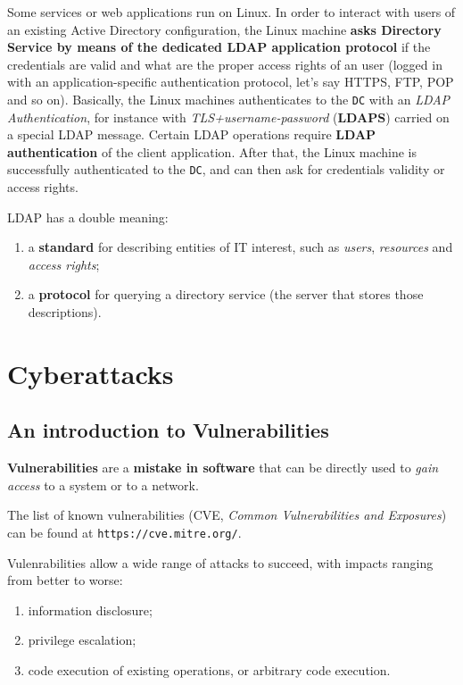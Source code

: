 \documentclass[10pt]{extbook}
\begin{document}
Some services or web applications run on Linux. In order to interact with users
of an existing Active Directory configuration, the Linux machine \textbf{asks
Directory Service by means of the dedicated LDAP application protocol} if the
credentials are valid and what are the proper access rights of an user (logged
in with an application\--specific authentication protocol, let's say HTTPS,
FTP, POP and so on). Basically, the Linux machines authenticates to the
\texttt{DC} with an \emph{LDAP Authentication}, for instance with
\emph{TLS+username\--password} (\textbf{LDAPS}) carried on a special LDAP
message. Certain LDAP operations require \textbf{LDAP authentication} of the
client application. After that, the Linux machine is successfully authenticated
to the \texttt{DC}, and can then ask for credentials validity or access rights.


LDAP has a double meaning:
\begin{enumerate}
    \item a \textbf{standard} for describing entities of IT interest, such as
        \emph{users}, \emph{resources} and \emph{access rights};
    \item a \textbf{protocol} for querying a directory service (the server that
        stores those descriptions).
\end{enumerate}





\part{Cyberattacks}

\chapter{An introduction to Vulnerabilities}

\textbf{Vulnerabilities} are a \textbf{mistake in software} that can be
directly used to \emph{gain access} to a system or to a network.

The list of known vulnerabilities (CVE, \emph{Common Vulnerabilities and
Exposures}) can be found at \texttt{https://cve.mitre.org/}.

Vulenrabilities allow a wide range of attacks to succeed, with impacts ranging
from better to worse:
\begin{enumerate}
    \item information disclosure;
    \item privilege escalation;
    \item code execution of existing operations, or arbitrary code execution.
\end{enumerate}
\end{document}
